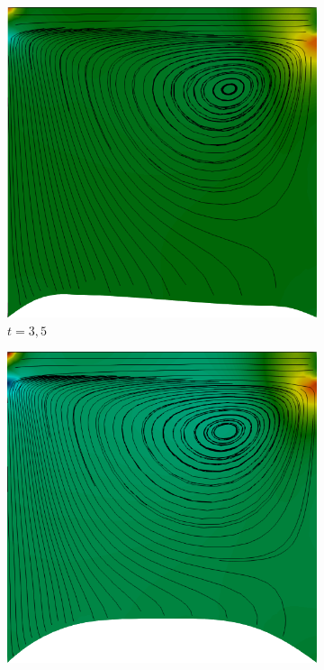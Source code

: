 \begin{figure}[h!]
    \centering
    \caption{Cavidade bidimensional - Campo de pressão e linhas de corrente na cavidade.}
    \begin{subfigure}[b]{0.3\textwidth}
        \includegraphics[width=\linewidth]{Figuras/FSI-Cavity2D/t3_5.png}
        \caption{$t=3,5$}
    \end{subfigure}
    \begin{subfigure}[b]{0.3\textwidth}
        \includegraphics[width=\linewidth]{Figuras/FSI-Cavity2D/t8.png}

\end{subfigure}
\end{figure}
